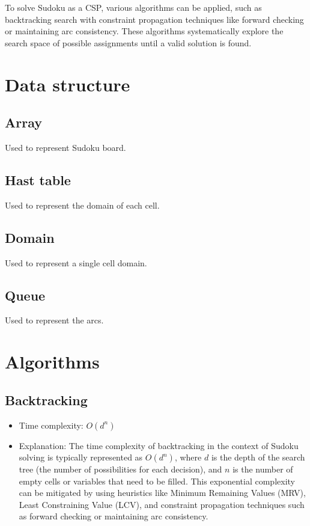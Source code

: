\documentclass{article}
\begin{document}
To solve Sudoku as a CSP, various algorithms can be applied, such as backtracking search with constraint propagation techniques like forward checking or maintaining arc consistency. These algorithms systematically explore the search space of possible assignments until a valid solution is found.


\section{Data structure}
\subsection*{Array}
Used to represent Sudoku board.
\subsection*{Hast table}
Used to represent the domain of each cell.
\subsection*{Domain}
Used to represent a single cell domain.
\subsection*{Queue}
Used to represent the arcs.

\section{Algorithms}
\subsection*{Backtracking}
\begin{itemize}
  \item Time complexity: $O(d^n)$
  \item Explanation: The time complexity of backtracking in the context of Sudoku solving is typically represented as $O(d^n)$, where $d$ is the depth of the search tree (the number of possibilities for each decision), and $n$ is the number of empty cells or variables that need to be filled. This exponential complexity can be mitigated by using heuristics like Minimum Remaining Values (MRV), Least Constraining Value (LCV), and constraint propagation techniques such as forward checking or maintaining arc consistency.
\end{itemize}
\newpage
\end{document}
